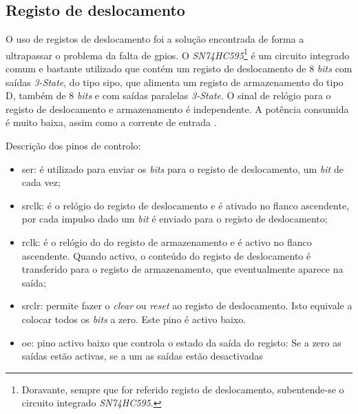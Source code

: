 \subsection{Registo de deslocamento}
\label{sec:registodeslocamento}
O uso de registos de deslocamento foi a solução encontrada de forma a ultrapassar o problema da falta de \acrshort{gpio}s. O \textit{SN74HC595}\footnote{Doravante, sempre que for referido registo de deslocamento, subentende-se o circuito integrado \textit{SN74HC595}.} é um circuito integrado comum e bastante utilizado que contém um registo de deslocamento de 8 \textit{bits} com saídas \textit{3-State}, do tipo \acrfull{sipo}, que alimenta um registo de armazenamento do tipo D, também de 8 \textit{bits} e com saídas paralelas \textit{3-State}. O sinal de relógio para o registo de deslocamento e armazenamento é independente. A potência consumida é muito baixa, assim como a corrente de entrada \cite{SN74HC595}.

Descrição dos pinos de controlo:
\begin{itemize}
    \item \acrfull{ser}: é utilizado para enviar os \textit{bits} para o registo de deslocamento, um \textit{bit} de cada vez;

    \item \acrfull{srclk}: é o relógio do registo de deslocamento e é ativado no flanco ascendente, por cada impulso dado um \textit{bit} é enviado para o registo de deslocamento;

    \item \acrfull{rclk}: é o relógio do do registo de armazenamento e é activo no flanco ascendente. Quando activo, o conteúdo do registo de deslocamento é transferido para o registo de armazenamento, que eventualmente aparece na saída;

    \item \acrfull{srclr}: permite fazer o \textit{clear} ou \textit{reset} ao registo de deslocamento. Isto equivale a colocar todos os \textit{bits} a zero. Este pino é activo baixo.

    \item \acrfull{oe}: pino activo baixo que controla o estado da saída do registo: Se a zero as saídas estão activas, se a um as saídas estão desactivadas
\end{itemize}

